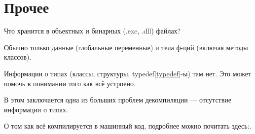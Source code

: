 ﻿\chapter{Прочее}

Что хранится в объектных и бинарных (.exe, .dll) файлах?

Обычно только данные (глобальные переменные) и тела ф-ций (включая методы классов).

Информации о типах (классы, структуры, typedef\ref{typedef}-ы) там нет. 
Это может помочь в понимании того как всё устроено.

В этом заключается одна из больших проблем декомпиляции --- отсутствие информации о типах.


О том как всё компилируется в машинный код, подробнее можно почитать здесь:\cite{REBook}.








